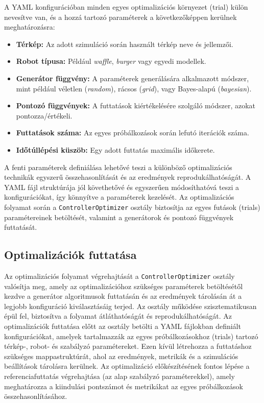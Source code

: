 A YAML konfigurációban minden egyes optimalizációs környezet (trial) külön nevesítve van, és a hozzá tartozó paraméterek a következőképpen kerülnek meghatározásra:
\begin{itemize}
    \item \textbf{Térkép:} Az adott szimuláció során használt térkép neve és jellemzői.
    \item \textbf{Robot típusa:} Például \textit{waffle}, \textit{burger} vagy egyedi modellek.
    \item \textbf{Generátor függvény:} A paraméterek generálására alkalmazott módszer, mint például véletlen (\textit{random}), rácsos (\textit{grid}), vagy Bayes-alapú (\textit{bayesian}).
    \item \textbf{Pontozó függvények:} A futtatások kiértékelésére szolgáló módszer, azokat pontozza/értékeli.
    \item \textbf{Futtatások száma:} Az egyes próbálkozások során lefutó iterációk száma.
    \item \textbf{Időtúllépési küszöb:} Egy adott futtatás maximális időkerete.
\end{itemize}

A fenti paraméterek definiálása lehetővé teszi a különböző optimalizációs technikák egyszerű összehasonlítását és az eredmények reprodukálhatóságát. A YAML fájl struktúrája jól követhetővé és egyszerűen módosíthatóvá teszi a konfigurációkat, így könnyítve a paraméterek kezelését. Az optimalizációs folyamat során a \texttt{ControllerOptimizer} osztály biztosítja az egyes futások (trials) paramétereinek betöltését, valamint a generátorok és pontozó függvények futtatását.

\subsection{Optimalizációk futtatása}
Az optimalizációs folyamat végrehajtását a \texttt{ControllerOptimizer} osztály valósítja meg, amely az optimalizációhoz szükséges paraméterek betöltésétől kezdve a generátor algoritmusok futtatásán és az eredmények tárolásán át a legjobb konfiguráció kiválasztásáig terjed. Az osztály működése szisztematikusan épül fel, biztosítva a folyamat átláthatóságát és reprodukálhatóságát. Az optimalizációk futtatása előtt az osztály betölti a YAML fájlokban definiált konfigurációkat, amelyek tartalmazzák az egyes próbálkozásokhoz (trials) tartozó térkép-, robot- és szabályzó paramétereket. Ezen kívül létrehozza a futtatáshoz szükséges mappastruktúrát, ahol az eredmények, metrikák és a szimulációs beállítások tárolásra kerülnek. Az optimalizáció előkészítésének fontos lépése a referenciafuttatás végrehajtása (az alap szabályzó paraméterekkel), amely meghatározza a kiindulási pontszámot és metrikákat az egyes próbálkozások összehasonlításához.

